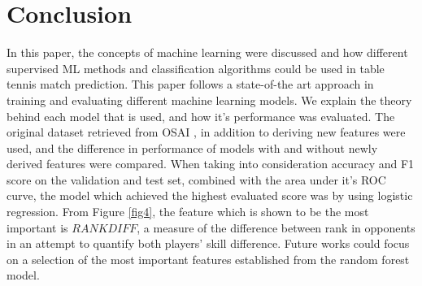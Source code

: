 \section{Conclusion} \label{conc}
In this paper, the concepts of machine learning were discussed and how different supervised ML methods and classification algorithms could be used in table tennis match prediction. 
This paper follows a state-of-the art approach in training and evaluating different machine learning models. We explain the theory behind each model that is used, and how it's performance was evaluated.
The original dataset retrieved from OSAI \cite{OSAI}, in addition to deriving new features were used, and the difference in performance of models with and without newly derived features were compared.
When taking into consideration accuracy and F1 score on the validation and test set, combined with the area under it's ROC curve, the model which achieved the highest evaluated score was by using logistic regression.
From Figure \ref{fig4}, the feature which is shown to be the most important is $RANKDIFF$, a measure of the difference between rank in opponents in an attempt to quantify both players' skill difference. 
Future works could focus on a selection of the most important features established from the random forest model.